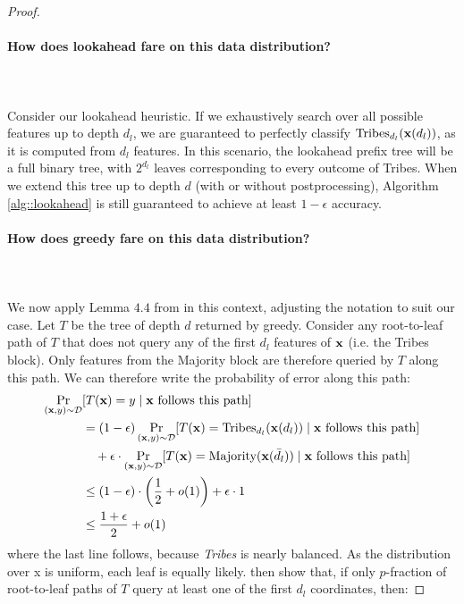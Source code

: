 \begin{proof}
\paragraph{How does lookahead fare on this data distribution?}\leavevmode\leavevmode\\\\
Consider our lookahead heuristic. If we exhaustively search over all possible features up to depth $d_l$, we are guaranteed to perfectly classify $\textrm{Tribes}_{d_l}(\mathbf{x}(d_l))$, as it is computed from $d_l$ features. In this scenario, the lookahead prefix tree will be a full binary tree, with $2^{d_l}$ leaves corresponding to every outcome of Tribes. When we extend this tree up to depth $d$ (with or without postprocessing), Algorithm \ref{alg::lookahead} is still guaranteed to achieve at least $1-\epsilon$ accuracy.
\paragraph{How does greedy fare on this data distribution?}\leavevmode\leavevmode\\\\
We now apply Lemma $4.4$ from \cite{topk} in this context, adjusting the notation to suit our case. Let $T$ be the tree of depth $d$ returned by greedy. Consider any root-to-leaf path of $T$ that does not query any of the first $d_l$ features of $\mathbf{x}$ (i.e. the Tribes block). Only features from the Majority block are therefore queried by $T$ along this path. We can therefore write the probability of error along this path: 
\begin{align*}
    \Pr_{(\mathbf{x},y)\sim \mathcal{D}} & [T(\mathbf{x}) = y \mid \mathbf{x} \text{ follows this path}]\\
    &= (1 - \epsilon) \Pr_{(\mathbf{x},y)\sim \mathcal{D}} [T(\mathbf{x}) = \text{Tribes}_{d_l}(\mathbf{x}(d_l)) \mid \mathbf{x} \text{ follows this path}] \\
    &\quad + \epsilon \cdot \Pr_{(\mathbf{x},y)\sim \mathcal{D}} [T(\mathbf{x}) = \text{Majority}(\mathbf{x}(\bar{d_l})) \mid \mathbf{x} \text{ follows this path}] \\
    &\leq (1 - \epsilon) \cdot \left( \frac{1}{2} + o(1) \right) + \epsilon \cdot 1 \\
    &\leq \frac{1 + \epsilon}{2} + o(1)
\end{align*}
where the last line follows, because \textit{Tribes} is nearly balanced. As the distribution over x
is uniform, each leaf is equally likely. \cite{topk} then show that, if only $p$-fraction of root-to-leaf paths of $T$ query at least one of the first $d_l$ coordinates, then: 

\end{proof}
